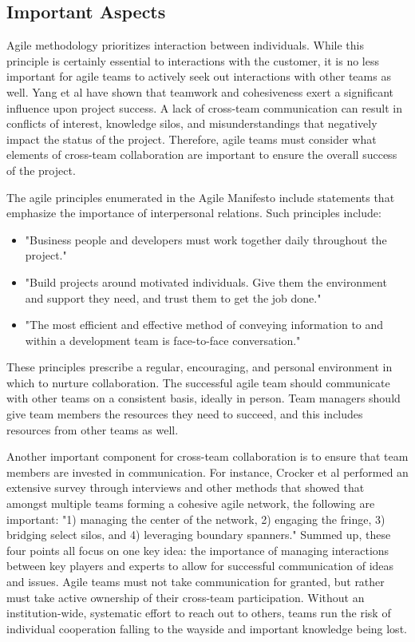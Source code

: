 \subsection{Important Aspects}

Agile methodology prioritizes interaction between individuals.
While this principle is certainly essential to interactions with the customer, it is no less important for agile teams to actively seek out interactions with other teams as well.
Yang et al\cite{YANG} have shown that teamwork and cohesiveness exert a significant influence upon project success.
A lack of cross-team communication can result in conflicts of interest, knowledge silos, and misunderstandings that negatively impact the status of the project.
Therefore, agile teams must consider what elements of cross-team collaboration are important to ensure the overall success of the project.

The agile principles enumerated in the Agile Manifesto include statements that emphasize the importance of interpersonal relations. Such principles include:
\begin{itemize}
\item "Business people and developers must work together daily throughout the project."
\item "Build projects around motivated individuals. Give them the environment and support they need, and trust them to get the job done."
\item "The most efficient and effective method of conveying information to and within a development team is face-to-face conversation." \cite{AgileMani}
\end{itemize}

These principles prescribe a regular, encouraging, and personal environment in which to nurture collaboration.
The successful agile team should communicate with other teams on a consistent basis, ideally in person.
Team managers should give team members the resources they need to succeed, and this includes resources from other teams as well.

Another important component for cross-team collaboration is to ensure that team members are invested in communication.
For instance, Crocker et al\cite{HBR} performed an extensive survey through interviews and other methods that showed that amongst multiple teams forming a cohesive agile network, the following are important: "1) managing the center of the network, 2) engaging the fringe, 3) bridging select silos, and 4) leveraging boundary spanners."
Summed up, these four points all focus on one key idea: the importance of managing interactions between key players and experts to allow for successful communication of ideas and issues.
Agile teams must not take communication for granted, but rather must take active ownership of their cross-team participation.
Without an institution-wide, systematic effort to reach out to others, teams run the risk of individual cooperation falling to the wayside and important knowledge being lost.

